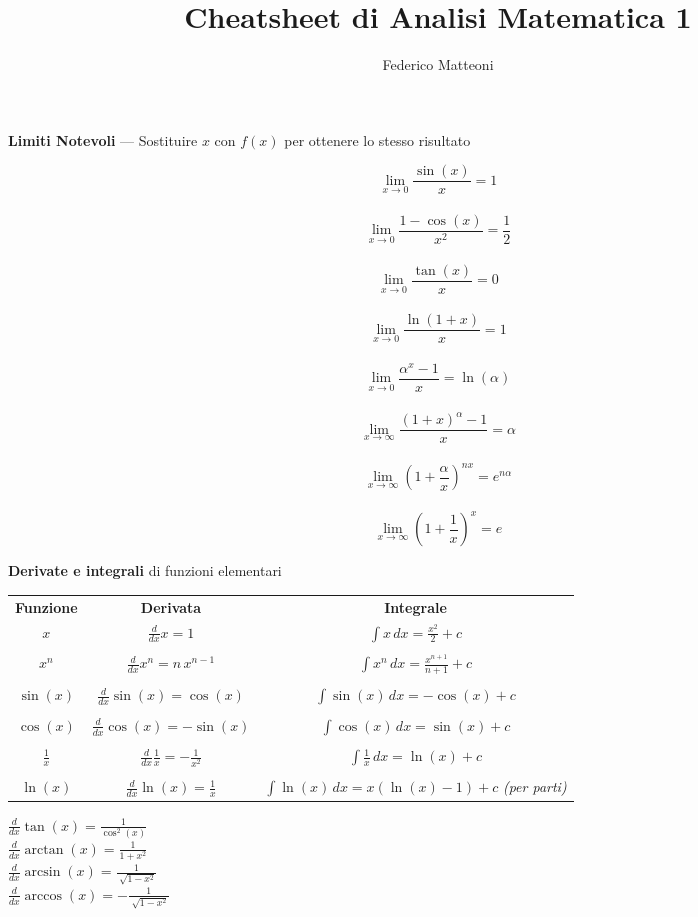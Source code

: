 \documentclass[10pt]{article}
\begin{document}
\title{Cheatsheet di Analisi Matematica 1}
\author{Federico Matteoni}
\date{ }
\renewcommand*\contentsname{Indice}

\maketitle
\textbf{Limiti Notevoli} --- Sostituire $x$ con $f(x)$ per ottenere lo stesso risultato
\begin{multicols}{4}
$$\lim_{x\to0} \frac{\sin(x)}{x} = 1$$\\
$$\lim_{x\to0} \frac{1 - \cos(x)}{x^2} = \frac{1}{2}$$\\
$$\lim_{x\to0} \frac{\tan(x)}{x} = 0$$\\
$$\lim_{x\to0} \frac{\ln(1 + x)}{x} = 1$$\\
$$\lim_{x\to0} \frac{\alpha^x - 1}{x} = \ln(\alpha)$$\\
$$\lim_{x\to\infty} \frac{(1 + x)^\alpha - 1}{x} = \alpha$$\\
$$\lim_{x\to\infty} (1 + \frac{\alpha}{x})^{nx} = e^{n\alpha}$$\\
$$\lim_{x\to\infty} (1 + \frac{1}{x})^{x} = e$$
\end{multicols}
\textbf{Derivate e integrali} di funzioni elementari
\begin{center}
	\begin{tabular}{c | c c}
		\textbf{Funzione} & \textbf{Derivata} & \textbf{Integrale} \\
		$x$ & $\frac{d}{dx} x = 1$ & $\int x\,dx = \frac{x^2}{2} + c$ \\
		\\
		$x^n$ & $\frac{d}{dx} x^n = n\,x^{n-1}$ & $\int x^n\,dx = \frac{x^{n+1}}{n+1} + c$ \\
		\\
		$\sin(x)$ & $\frac{d}{dx} \sin(x) = \cos(x)$ & $\int \sin(x)\,dx = -\cos(x) + c$ \\
		\\
		$\cos(x)$ & $\frac{d}{dx} \cos(x) = -\sin(x)$ & $\int \cos(x)\,dx = \sin(x) + c$ \\
		\\
		$\frac{1}{x}$ & $\frac{d}{dx} \frac{1}{x} = -\frac{1}{x^2}$ & $\int \frac{1}{x}\,dx = \ln(x) + c$ \\
		\\
		$\ln(x)$ & $\frac{d}{dx} \ln(x) = \frac{1}{x}$ & $\int \ln(x)\,dx = x(\ln(x) - 1) + c$ \textit{(per parti)} \\
	\end{tabular}
	\begin{multicols}{4}
		$\frac{d}{dx} \tan(x) = \frac{1}{\cos^2(x)}$ \\
		$\frac{d}{dx} \arctan(x) = \frac{1}{1 + x^2}$ \\
		$\frac{d}{dx} \arcsin(x) = \frac{1}{\sqrt[]{1 - x^2}}$\\
		$\frac{d}{dx} \arccos(x) = -\frac{1}{\sqrt[]{1 - x^2}}$\\
	\end{multicols}
\end{center}
\end{document}
